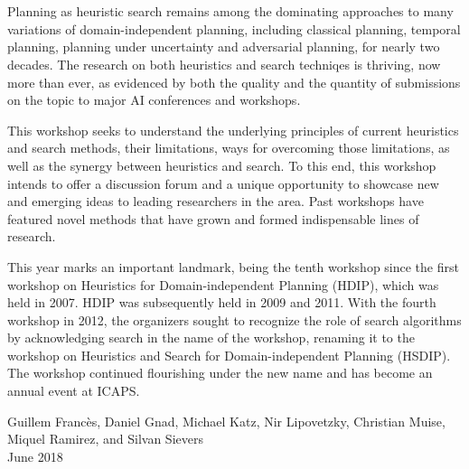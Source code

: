 \section*{}
Planning as heuristic search remains among the dominating approaches to many
variations of domain-independent planning, including classical planning,
temporal planning, planning under uncertainty and adversarial planning, for
nearly two decades. The research on both heuristics and search techniqes is
thriving, now more than ever, as evidenced by both the quality and the quantity
of submissions on the topic to major AI conferences and workshops.

This workshop seeks to understand the underlying principles of current
heuristics and search methods, their limitations, ways for overcoming those
limitations, as well as the synergy between heuristics and search. To this end,
this workshop intends to offer a discussion forum and a unique opportunity to
showcase new and emerging ideas to leading researchers in the area. Past
workshops have featured novel methods that have grown and formed indispensable
lines of research.

This year marks an important landmark, being the tenth workshop since the first
workshop on Heuristics for Domain-independent Planning (HDIP), which was held in
2007.
HDIP was subsequently held in 2009 and 2011. With the fourth workshop in 2012,
the organizers sought to recognize the role of search algorithms by
acknowledging search in the name of the workshop, renaming it to the workshop
on Heuristics and Search for Domain-independent Planning (HSDIP). The workshop
continued flourishing under the new name and has become an annual event at
ICAPS.

\bigskip
\begin{flushright}
Guillem Franc\`es,
Daniel Gnad,
Michael Katz,
Nir Lipovetzky,
Christian Muise,
Miquel Ramirez, and Silvan Sievers
\\
June 2018
\end{flushright}
